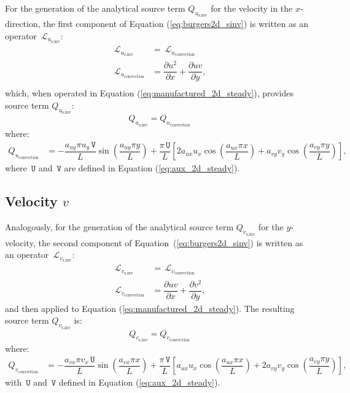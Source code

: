 \documentclass[10pt]{article}
\newcommand{\diff}[2] {\dfrac{\partial #1}{\partial #2}}
\newcommand{\Lo}{\,\mathcal{L}}
\newcommand{\U}{\,\mathtt{U}}
\newcommand{\V}{\,\mathtt{V}}
\begin{document}
For the generation of the analytical source term $Q_{u_\text{s,inv}}$ for the velocity in the $x$-direction, the first component of Equation  (\ref{eq:burgers2d_sinv}) is written as an  operator $\Lo_{u_\text{s,inv}}$:
\begin{equation*}
 \begin{split}
\Lo_{u_\text{s,inv}}&= \Lo_{u_\text{convection}}\\
\Lo_{u_\text{convection}}&= \diff{ u^2 }{x}+\diff{uv}{y},\\
\end{split}
\end{equation*}
which, when operated in Equation (\ref{eq:manufactured_2d_steady}), provides source term $Q_{u_\text{s,inv}}$:
$$Q_{u_\text{s,inv}}= Q_{u_\text{convection}}$$
where:
\begin{equation}
\begin{split}
Q_{u_\text{convection}} &= -\dfrac{a_{uy} \pi u_y \V}{L} \sin\left(\dfrac{a_{uy} \pi y}{L}\right)+\dfrac{\pi \U}{L}\left[2 a_{ux} u_x \cos\left(\dfrac{a_{ux} \pi x}{L}\right)+a_{vy} v_y \cos\left(\dfrac{a_{vy} \pi y}{L}\right)\right] , 
\end{split}
\end{equation}
where $\U$ and $\V$ are defined in Equation (\ref{eq:aux_2d_steady}).


\subsection{Velocity $v$}
Analogously, for the generation of the analytical source term $Q_{v_\text{s,inv}}$ for the $y$-velocity, the second component of  Equation~(\ref{eq:burgers2d_sinv}) is written as an  operator $\Lo_{v_\text{s,inv}}$:
\begin{equation*}
\begin{split}
\Lo_{v_\text{s,inv}}&= \Lo_{v_\text{convection}}\\
\Lo_{v_\text{convection}}&=\diff{ u v}{x} + \diff{  v^2 }{y},
\end{split}
\end{equation*}
%
and then applied to Equation  (\ref{eq:manufactured_2d_steady}).  The resulting source term $Q_{v_\text{s,inv}}$ is:
$$Q_{v_\text{s,inv}}= Q_{v_\text{convection}}$$
where:
\begin{equation}
\begin{split}
%
 Q_{v_\text{convection}} &= -\dfrac{a_{vx} \pi v_x \U}{L} \sin\left(\dfrac{a_{vx} \pi x}{L}\right)+\dfrac{ \pi \V}{L}\left[a_{ux} u_x \cos\left(\dfrac{a_{ux} \pi x}{L}\right)+2 a_{vy} v_y \cos\left(\dfrac{a_{vy} \pi y}{L}\right)\right] , 
%
\end{split}
\end{equation}
with $\U$ and $\V$ defined in Equation (\ref{eq:aux_2d_steady}).
\end{document}
